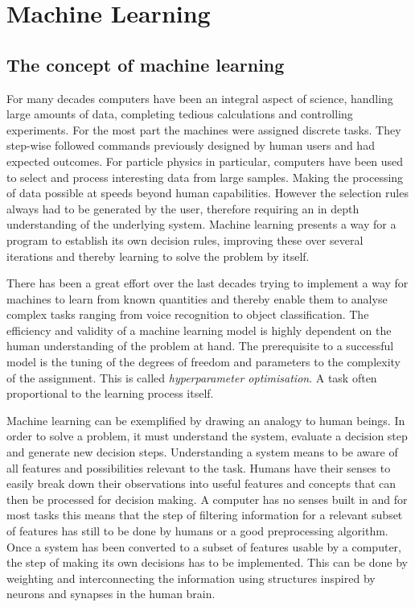 \chapter{Machine Learning}

\section{The concept of machine learning}

For many decades computers have been an integral aspect of science, handling large amounts of data, completing tedious calculations and controlling experiments. For the most part the  machines were assigned discrete tasks. They step-wise followed commands previously designed by human users and had expected outcomes. 
For particle physics in particular, computers have been used to select and process interesting data from large samples. Making the processing of data possible at speeds beyond human capabilities. However the selection rules always had to be generated by the user, therefore requiring an in depth understanding of the underlying system. Machine learning presents a way for a program to establish its own decision rules, improving these over several iterations and thereby learning to solve the problem by itself.

There has been a great effort over the last decades trying to implement a way for machines to learn from known quantities and thereby enable them to analyse complex tasks ranging from voice recognition to object classification.
The efficiency and validity of a machine learning model is highly dependent on the human understanding of the problem at hand. The prerequisite to a successful model is the tuning of the degrees of freedom and parameters to the complexity of the assignment. This is called \emph{hyperparameter optimisation}. A task often proportional to the learning process itself.


Machine learning can be exemplified by drawing an analogy to human beings. In order to solve a problem, it must understand the system, evaluate a decision step and generate new decision steps.
Understanding a system means to be aware of all features and possibilities relevant to the task. Humans have their senses to easily break down their observations into useful features and concepts that can then be processed for decision making. A computer has no senses built in and for most tasks this means that the step of filtering information for a relevant subset of features has still to be done by humans or a good preprocessing algorithm.
Once a system has been converted to a subset of features usable by a computer, the step of making its own decisions has to be implemented. This can be done by weighting and interconnecting the information using structures inspired by neurons and synapses in the human brain. 


